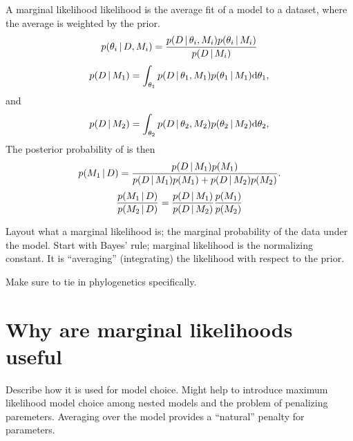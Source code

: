 \begin{linenomath}
A marginal likelihood likelihood is the average fit of a model to a dataset, where
the average is weighted by the prior.
\begin{equation}
    p(\parameters \given \data, \model) = \frac{
        p(\data \given \parameters, \model) p(\parameters \given \model)
    }{
        p(\data \given \model)
    }
    \label{eq:bayesRule}
\end{equation}
\begin{equation}
    p(\data \given \model[1]) = \int_{\parameters[1]}
    p( \data \given \parameters[1], \model[1]) p(\parameters[1] \given \model[1])
    \diff{\parameters[1]},
    \label{eq:marginalLikelihood}
\end{equation}
and
\begin{equation}
    p(\data \given \model[2]) = \int_{\parameters[2]}
    p( \data \given \parameters[2], \model[2]) p(\parameters[2] \given \model[2])
    \diff{\parameters[2]},
\end{equation}
The posterior probability of \model[1] is then
\begin{equation}
    p(\model[1] \given \data) = \frac{
        p(\data \given \model[1]) p(\model[1])
    }{
        p(\data \given \model[1]) p(\model[1]) + p(\data \given \model[2]) p(\model[2])
    }.
\end{equation}
\begin{equation}
    \frac{p(\model[1] \given \data)}{p(\model[2] \given \data)} = 
    \frac{p(\data \given \model[1])}{p(\data \given \model[2])}
    \frac{p(\model[1])}{p(\model[2])}
\end{equation}
\end{linenomath}

Layout what a marginal likelihood is; the marginal probability of the data
under the model. Start with Bayes' rule; marginal likelihood is the normalizing
constant. It is ``averaging'' (integrating) the likelihood with respect to the
prior.

Make sure to tie in phylogenetics specifically.

\section{Why are marginal likelihoods useful}

Describe how it is used for model choice. Might help to introduce maximum
likelihood model choice among nested models and the problem of penalizing
paremeters. Averaging over the model provides a ``natural'' penalty for
parameters.

